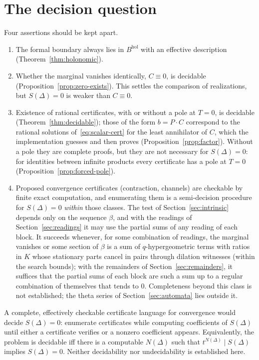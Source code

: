 \documentclass[11pt,a4paper]{article}
\newcommand{\Bhol}{B^{\mathrm{hol}}}
\theoremstyle{plain}
\theoremstyle{definition}
\theoremstyle{remark}
\begin{document}
\section{The decision question}\label{sec:decision}
Four assertions should be kept apart.
\begin{enumerate}
\item The formal boundary always lies in $\Bhol$ with an effective description
  (Theorem~\ref{thm:holonomic}).
\item Whether the marginal vanishes identically, $C\equiv0$, is decidable
  (Proposition~\ref{prop:zero-exists}). This settles the comparison of
  realizations, but $S(\Delta)=0$ is weaker than $C\equiv0$.
\item Existence of rational certificates, with or without a pole at $T=0$, is
  decidable (Theorem~\ref{thm:decidable}); those of the form $b=P\cdot C$
  correspond to the rational solutions of~\eqref{eq:scalar-cert} for the least
  annihilator of $C$, which the implementation guesses and then proves
  (Proposition~\ref{prop:factor}). Without a pole they are complete
  proofs, but they are not necessary for $S(\Delta)=0$: for identities between
  infinite products every certificate has a pole at $T=0$
  (Proposition~\ref{prop:forced-pole}).
\item Proposed convergence certificates (contraction, channels) are checkable by
  finite exact computation, and enumerating them is a semi-decision
  procedure for $S(\Delta)=0$ \emph{within} those classes. The test of
  Section~\ref{sec:intrinsic} depends only on the sequence $\beta$, and with the
  readings of Section~\ref{sec:readings} it may use the partial sums of any
  reading of each block. It succeeds whenever, for some combination of
  readings, the marginal vanishes or some section of $\beta$ is a sum of
  $q$-hypergeometric terms with ratios in $K$ whose stationary parts cancel in
  pairs through dilation witnesses (within the search bounds); with the
  remainders of Section~\ref{sec:remainders}, it suffices that the partial sums
  of each block are such a sum up to a regular combination of themselves that
  tends to $0$. Completeness beyond this class is not established; the theta
  series of Section~\ref{sec:automata} lies outside it.
\end{enumerate}
A complete, effectively checkable certificate language for convergence would
decide $S(\Delta)=0$: enumerate certificates while computing coefficients of
$S(\Delta)$ until either a certificate verifies or a nonzero coefficient
appears. Equivalently, the problem is decidable iff there is a computable
$N(\Delta)$ such that $t^{N(\Delta)}\mid S(\Delta)$ implies $S(\Delta)=0$.
Neither decidability nor undecidability is established here.
\end{document}
